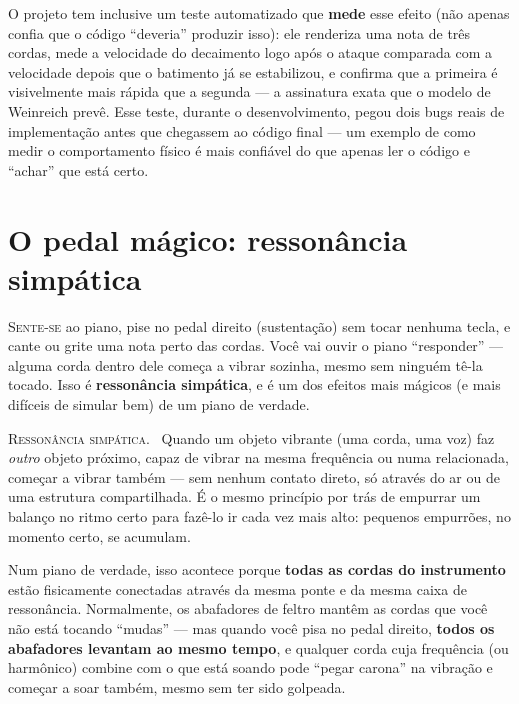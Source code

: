 \documentclass[11pt,oneside]{book}
\newcommand{\nova}[1]{\textsc{\color{accent}#1.}~}
\newcommand{\opening}[2]{\lettrine[lines=2,loversize=0.08,lraise=0.02]{#1}{#2}}
\begin{document}
O projeto tem inclusive um teste automatizado que \textbf{mede} esse
efeito (não apenas confia que o código \enquote{deveria} produzir isso):
ele renderiza uma nota de três cordas, mede a velocidade do decaimento logo
após o ataque comparada com a velocidade depois que o batimento já se
estabilizou, e confirma que a primeira é visivelmente mais rápida que a
segunda --- a assinatura exata que o modelo de Weinreich prevê. Esse teste,
durante o desenvolvimento, pegou dois bugs reais de implementação antes que
chegassem ao código final --- um exemplo de como medir o comportamento
físico é mais confiável do que apenas ler o código e \enquote{achar} que
está certo.

\chapter{O pedal mágico: ressonância simpática}

\opening{S}{ente-se} ao piano, pise no pedal direito (sustentação) sem
tocar nenhuma tecla, e cante ou grite uma nota perto das cordas. Você vai
ouvir o piano \enquote{responder} --- alguma corda dentro dele começa a
vibrar sozinha, mesmo sem ninguém tê-la tocado. Isso é \textbf{ressonância
simpática}, e é um dos efeitos mais mágicos (e mais difíceis de simular
bem) de um piano de verdade.

\begin{newword}
\nova{Ressonância simpática} Quando um objeto vibrante (uma corda, uma
voz) faz \emph{outro} objeto próximo, capaz de vibrar na mesma frequência
ou numa relacionada, começar a vibrar também --- sem nenhum contato
direto, só através do ar ou de uma estrutura compartilhada. É o mesmo
princípio por trás de empurrar um balanço no ritmo certo para fazê-lo ir
cada vez mais alto: pequenos empurrões, no momento certo, se acumulam.
\end{newword}

Num piano de verdade, isso acontece porque \textbf{todas as cordas do
instrumento} estão fisicamente conectadas através da mesma ponte e da
mesma caixa de ressonância. Normalmente, os abafadores de feltro mantêm as
cordas que você não está tocando \enquote{mudas} --- mas quando você pisa
no pedal direito, \textbf{todos os abafadores levantam ao mesmo tempo}, e
qualquer corda cuja frequência (ou harmônico) combine com o que está soando
pode \enquote{pegar carona} na vibração e começar a soar também, mesmo sem
ter sido golpeada.
\end{document}
